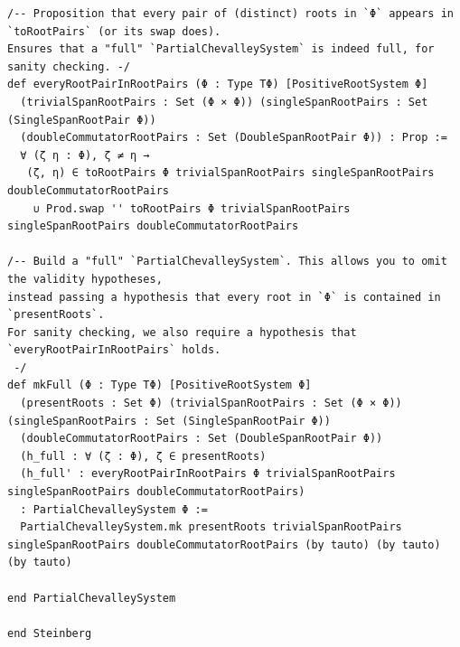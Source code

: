 \documentclass[10pt,a4paper]{article}
\begin{document}
\begin{Verbatim}
/-- Proposition that every pair of (distinct) roots in `Φ` appears in `toRootPairs` (or its swap does).
Ensures that a "full" `PartialChevalleySystem` is indeed full, for sanity checking. -/
def everyRootPairInRootPairs (Φ : Type TΦ) [PositiveRootSystem Φ]
  (trivialSpanRootPairs : Set (Φ × Φ)) (singleSpanRootPairs : Set (SingleSpanRootPair Φ))
  (doubleCommutatorRootPairs : Set (DoubleSpanRootPair Φ)) : Prop :=
  ∀ (ζ η : Φ), ζ ≠ η →
   (ζ, η) ∈ toRootPairs Φ trivialSpanRootPairs singleSpanRootPairs doubleCommutatorRootPairs
    ∪ Prod.swap '' toRootPairs Φ trivialSpanRootPairs singleSpanRootPairs doubleCommutatorRootPairs

/-- Build a "full" `PartialChevalleySystem`. This allows you to omit the validity hypotheses,
instead passing a hypothesis that every root in `Φ` is contained in `presentRoots`.
For sanity checking, we also require a hypothesis that `everyRootPairInRootPairs` holds.
 -/
def mkFull (Φ : Type TΦ) [PositiveRootSystem Φ]
  (presentRoots : Set Φ) (trivialSpanRootPairs : Set (Φ × Φ)) (singleSpanRootPairs : Set (SingleSpanRootPair Φ))
  (doubleCommutatorRootPairs : Set (DoubleSpanRootPair Φ))
  (h_full : ∀ (ζ : Φ), ζ ∈ presentRoots)
  (h_full' : everyRootPairInRootPairs Φ trivialSpanRootPairs singleSpanRootPairs doubleCommutatorRootPairs)
  : PartialChevalleySystem Φ :=
  PartialChevalleySystem.mk presentRoots trivialSpanRootPairs singleSpanRootPairs doubleCommutatorRootPairs (by tauto) (by tauto) (by tauto)

end PartialChevalleySystem

end Steinberg
\end{Verbatim}
\end{document}
